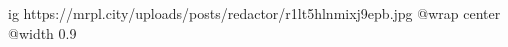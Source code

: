  
 
 
 
 

\ifcmt
  ig https://mrpl.city/uploads/posts/redactor/r1lt5hlnmixj9epb.jpg
  @wrap center
  @width 0.9
\fi
